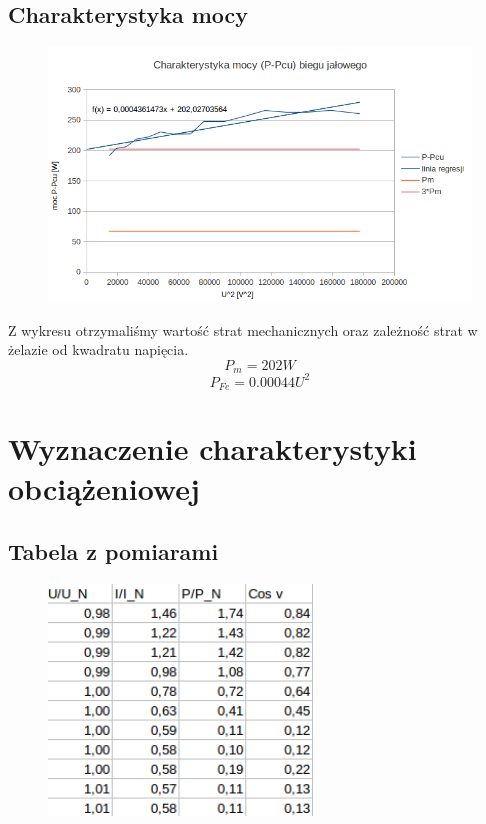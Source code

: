 \documentclass[12pt]{article}
\newcommand{\ZMa}{17}
\begin{document}
\subsection{Charakterystyka mocy}
	\begin{figure}[H]
			\centering
			\includegraphics[width=\ZMa cm]{jalowy_moc}
	\end{figure}
Z wykresu otrzymaliśmy wartość strat mechanicznych oraz zależność strat w żelazie od kwadratu napięcia.
\begin{equation}
	P_m=202W
\end{equation}
\begin{equation}
	P_{Fe}=0.00044U^2
\end{equation}

\section{Wyznaczenie charakterystyki obciążeniowej}
\subsection{Tabela z pomiarami}
	\begin{figure}[H]
			\centering
			\includegraphics[width=7cm]{obciazenie_tab}
	\end{figure}
	
\end{document}
